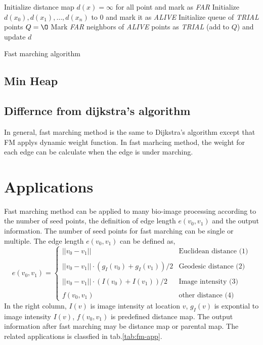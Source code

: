 \begin{algorithm}[H]
\label{alg:fast-marching}
\SetAlgoLined
{}
Initialize distance map $d(x) = \infty$ for all point and mark as \emph{FAR} \;
Initialize $d(x_0),d(x_1),\ldots,d(x_n)$ to $0$ and mark it as \emph{ALIVE} \;
Initialize queue of \emph{TRIAL} points $Q = \O$ \;
Mark \emph{FAR} neighbors of \emph{ALIVE} points as \emph{TRIAL} (add to $Q$) and update $d$ \;
\caption{Fast marching algorithm}
\end{algorithm}
\subsection{Min Heap}

\subsection{Differnce from dijkstra's algorithm}
In general, fast marching method is the same to Dijkstra's algorithm except that FM applys dynamic weight function. In fast marhcing method, the weight for each edge can be calculate when the edge is under marching.
\section{Applications}
Fast marching method can be applied to many bio-image processing according to the number of seed points, the definition of edge length $e(v_0,v_1)$ and the output information. The number of seed points for fast marching can be single or multiple. The edge length $e(v_0,v_1)$ can be defined as,
$$
e(v_0,v_1) = \left\{ 
    \begin{array}{lr}
    ||v_0 - v_1|| & \mbox{Euclidean distance (1)} \\
    \\
    ||v_0 - v_1|| \cdot (g_I(v_0) + g_I(v_1))/2 & \mbox{Geodesic distance (2)} \\
    \\
    ||v_0 - v_1|| \cdot (I(v_0) + I(v_1))/2 & \mbox{Image intensity (3)} \\
    \\
    f(v_0,v_1) & \mbox{other distance (4)}
    \end{array}
    \right.
$$
In the right column, $I(v)$ is image intensity at location $v$, $g_I(v)$ is expontial to image intensity $I(v)$, $f(v_0,v_1)$ is predefined distance map. The output information after fast marching may be distance map or parental map.  The related applications is classfied in tab.\ref{tab:fm-app}.\\

